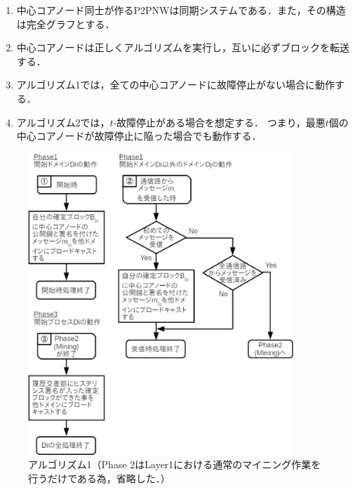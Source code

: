 \documentclass[a4paper,12pt]{jsarticle}
\begin{document}
\hspace{3mm}
%
\begin{enumerate}
  \item 中心コアノード同士が作るP2PNWは同期システムである．また，その構造は完全グラフとする．
  
  \item 中心コアノードは正しくアルゴリズムを実行し，互いに必ずブロックを転送する．
  
  \item アルゴリズム1では，全ての中心コアノードに故障停止がない場合に動作する．
  
  \item アルゴリズム2では，$t$-故障停止がある場合を想定する．
        つまり，最悪$t$個の中心コアノードが故障停止に陥った場合でも動作する．
\end{enumerate}
%
\hspace{3mm}
%
\begin{figure}[H]%
  \begin{center}
    \includegraphics[width=100mm]{pht/flow_chart-algorithm1.eps}
  \end{center}
  \caption{アルゴリズム1（Phase 2はLayer1における通常のマイニング作業を行うだけである為，省略した．）}
  \label{fig:algorithm1}
\end{figure}
%
%
\end{document}
